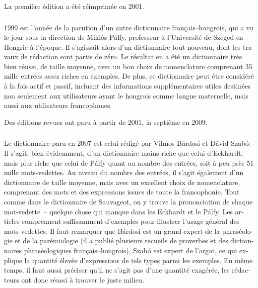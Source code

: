 \documentclass[output=paper,colorlinks,citecolor=brown,arabicfont,chinesefont,booklanguage=french]{langscibook}
\begin{document}
\begin{otherlanguage}{french}
La première édition a été réimprimée en 2001.

\subsubsection{\citealt{Palfy1999}}\label{sec:tillinger:2.1.8}

1999 est l’année de la parution d’un autre dictionnaire français–hongrois, qui a vu le jour sous la direction de Miklós Pálfy, professeur à l’Université de Szeged en Hongrie à l’époque. Il s’agissait alors d’un dictionnaire tout nouveau, dont les travaux de rédaction sont partis de zéro. Le résultat en a été un dictionnaire très bien réussi, de taille moyenne, avec un bon choix de nomenclature comprenant 35 mille entrées assez riches en exemples. De plus, ce dictionnaire peut être considéré à la fois actif et passif, incluant des informations supplémentaires utiles destinées non seulement aux utilisateurs ayant le hongrois comme langue maternelle, mais aussi aux utilisateurs francophones. 

Des éditions revues ont paru à partir de 2001, la septième en 2009.

\subsubsection{\citealt{BardosiSzabo2007} }\label{sec:tillinger:2.1.9}

Le dictionnaire paru en 2007 est celui rédigé par Vilmos Bárdosi et Dávid Szabó. Il s’agit, bien évidemment, d’un dictionnaire moins riche que celui d’Eckhardt, mais plus riche que celui de Pálfy quant au nombre des entrées, soit à peu près 51 mille mots-vedettes. Au niveau du nombre des entrées, il s’agit également d’un dictionnaire de taille moyenne, mais avec un excellent choix de nomenclature, comprenant des mots et des expressions issues de toute la francophonie. Tout comme dans le dictionnaire de Sauvageot, on y trouve la prononciation de chaque mot-vedette~-- quelque chose qui manque dans les Eckhardt et le Pálfy. Les articles comprennent suffisamment d’exemples pour illustrer l’usage général des mots-vedettes. Il faut remarquer que Bárdosi est un grand expert de la phraséologie et de la parémiologie (il a publié plusieurs recueils de proverbes et des dictionnaires phraséologiques français–hongrois), Szabó est expert de l’argot, ce qui explique la quantité élevée d'expressions de tels types parmi les exemples. En même temps, il faut aussi préciser qu’il ne s’agit pas d’une quantité exagérée, les rédacteurs ont donc réussi à trouver le juste milieu. 


\end{otherlanguage}
\end{document}
